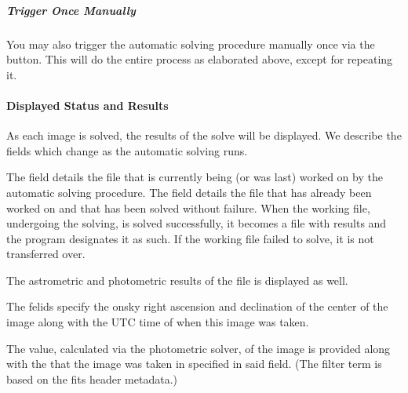 \documentclass[letterpaper,11pt,english]{sphinxmanual}
\begin{document}
\subparagraph{Trigger Once Manually}
\label{\detokenize{user/automatic_mode:trigger-once-manually}}
\sphinxAtStartPar
You may also trigger the automatic solving procedure manually once via the
 button. This will do the entire process as elaborated
above, except for repeating it.


\paragraph{Displayed Status and Results}
\label{\detokenize{user/automatic_mode:displayed-status-and-results}}
\sphinxAtStartPar
As each image is solved, the results of the solve will be displayed. We
describe the fields which change as the automatic solving runs.

\sphinxAtStartPar
The  field details the file that is currently being (or
was last) worked on by the automatic solving procedure. The
 field details the file that has already been worked on
and that has been solved without failure. When the working file, undergoing the
solving, is solved successfully, it becomes a file with results and the
program designates it as such. If the working file failed to solve, it is not
transferred over.

\sphinxAtStartPar
The astrometric and photometric results of the  file is
displayed as well.

\sphinxAtStartPar
The  felids specify the on\sphinxhyphen{}sky right ascension and
declination of the center of the image along with the UTC time of when this
image was taken.

\sphinxAtStartPar
The  value, calculated via the photometric solver, of
the image is provided along with the  that the image was
taken in specified in said field. (The filter term is based on the fits
header metadata.)
\end{document}
